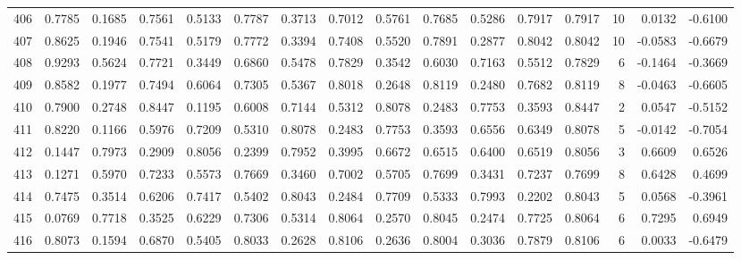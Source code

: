 \begin{tabular}{lrrrrrrrrrrrrrrr}
406 &      0.7785 &  0.1685 &  0.7561 &  0.5133 &  0.7787 &  0.3713 &  0.7012 &  0.5761 &  0.7685 &  0.5286 &   0.7917 &     0.7917 &     10 &                    0.0132 &                    -0.6100 \\
407 &      0.8625 &  0.1946 &  0.7541 &  0.5179 &  0.7772 &  0.3394 &  0.7408 &  0.5520 &  0.7891 &  0.2877 &   0.8042 &     0.8042 &     10 &                   -0.0583 &                    -0.6679 \\
408 &      0.9293 &  0.5624 &  0.7721 &  0.3449 &  0.6860 &  0.5478 &  0.7829 &  0.3542 &  0.6030 &  0.7163 &   0.5512 &     0.7829 &      6 &                   -0.1464 &                    -0.3669 \\
409 &      0.8582 &  0.1977 &  0.7494 &  0.6064 &  0.7305 &  0.5367 &  0.8018 &  0.2648 &  0.8119 &  0.2480 &   0.7682 &     0.8119 &      8 &                   -0.0463 &                    -0.6605 \\
410 &      0.7900 &  0.2748 &  0.8447 &  0.1195 &  0.6008 &  0.7144 &  0.5312 &  0.8078 &  0.2483 &  0.7753 &   0.3593 &     0.8447 &      2 &                    0.0547 &                    -0.5152 \\
411 &      0.8220 &  0.1166 &  0.5976 &  0.7209 &  0.5310 &  0.8078 &  0.2483 &  0.7753 &  0.3593 &  0.6556 &   0.6349 &     0.8078 &      5 &                   -0.0142 &                    -0.7054 \\
412 &      0.1447 &  0.7973 &  0.2909 &  0.8056 &  0.2399 &  0.7952 &  0.3995 &  0.6672 &  0.6515 &  0.6400 &   0.6519 &     0.8056 &      3 &                    0.6609 &                     0.6526 \\
413 &      0.1271 &  0.5970 &  0.7233 &  0.5573 &  0.7669 &  0.3460 &  0.7002 &  0.5705 &  0.7699 &  0.3431 &   0.7237 &     0.7699 &      8 &                    0.6428 &                     0.4699 \\
414 &      0.7475 &  0.3514 &  0.6206 &  0.7417 &  0.5402 &  0.8043 &  0.2484 &  0.7709 &  0.5333 &  0.7993 &   0.2202 &     0.8043 &      5 &                    0.0568 &                    -0.3961 \\
415 &      0.0769 &  0.7718 &  0.3525 &  0.6229 &  0.7306 &  0.5314 &  0.8064 &  0.2570 &  0.8045 &  0.2474 &   0.7725 &     0.8064 &      6 &                    0.7295 &                     0.6949 \\
416 &      0.8073 &  0.1594 &  0.6870 &  0.5405 &  0.8033 &  0.2628 &  0.8106 &  0.2636 &  0.8004 &  0.3036 &   0.7879 &     0.8106 &      6 &                    0.0033 &                    -0.6479 \\

\end{tabular}
